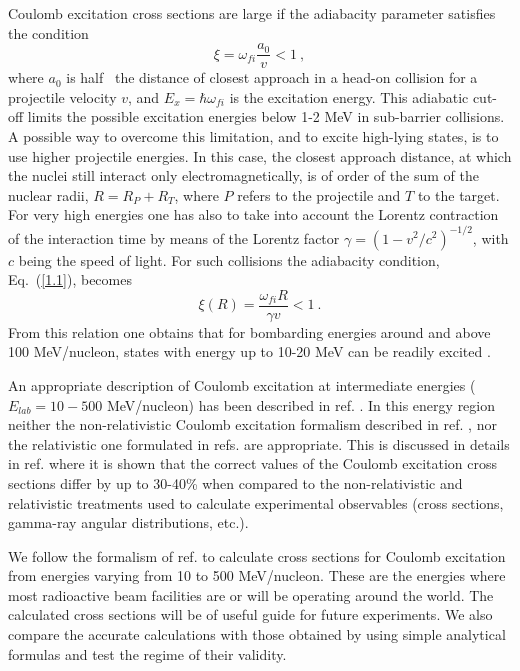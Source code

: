 \documentclass[prc,preprint,showpacs,showkeys,nofootinbib]{revtex4}%
\begin{document}
Coulomb excitation cross sections are large if the adiabacity parameter
satisfies the condition
\begin{equation}
\xi=\omega_{fi}\dfrac{a_{0}}{v}<1\ , \label{1.1}%
\end{equation}
where $a_{0}$ is half \ the distance of closest approach in a
head-on collision for a projectile velocity $v$, and
$E_{x}=\hbar\omega_{fi}$ is the excitation energy. This adiabatic
cut-off limits the possible excitation energies below 1-2 MeV in
sub-barrier collisions. A possible way to overcome this limitation,
and to excite high-lying states, is to use higher projectile
energies. In this case, the closest approach distance, at which the
nuclei still interact only electromagnetically, is of order of the
sum of the nuclear radii, $R=R_{P}+R_{T}$, where $P$ refers to the
projectile and $T$ to the target. For very high energies one has
also to take into account the Lorentz contraction
of the interaction time by means of the Lorentz factor $\gamma=(1-v^{2}%
/c^{2})^{-1/2}$, with $c$ being the speed of light. For such collisions the
adiabacity condition, Eq.~(\ref{1.1}), becomes
\begin{equation}
\xi(R)=\frac{\omega_{fi}R}{\gamma v}<1\ . \label{1.3}%
\end{equation}
From this relation one obtains that for bombarding energies around
and above 100 MeV/nucleon, states with energy up to 10-20 MeV can be
readily excited \cite{WA79}.

An appropriate description of Coulomb excitation at intermediate
energies ($E_{lab}=10-500$ MeV/nucleon) has been described in ref.
\cite{Ber03}. In this energy region neither the non-relativistic
Coulomb excitation formalism described in ref. \cite{AW75}, nor the
relativistic one formulated in refs. \cite{WA79,BB85} are
appropriate. This is discussed in details in ref. \cite{Ber03} where
it is shown that the correct values of the Coulomb excitation cross
sections differ by up to 30-40\% when compared to the
non-relativistic and relativistic treatments used to calculate
experimental observables (cross sections, gamma-ray angular
distributions, etc.).

We follow the formalism of ref. \cite{Ber03} to calculate cross
sections for Coulomb excitation from energies varying from 10 to 500
MeV/nucleon. These are the energies where most radioactive beam
facilities are or will be operating around the world. The calculated
cross sections will be of useful guide for future experiments. We
also compare the accurate calculations with those obtained by using
simple analytical formulas and test the regime of their validity.
\end{document}
